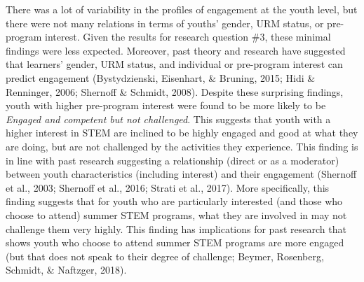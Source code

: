 \documentclass[]{book}
\theoremstyle{definition}
\theoremstyle{definition}
\theoremstyle{definition}
\theoremstyle{remark}
\begin{document}
There was a lot of variability in the profiles of engagement at the
youth level, but there were not many relations in terms of youths'
gender, URM status, or pre-program interest. Given the results for
research question \#3, these minimal findings were less expected.
Moreover, past theory and research have suggested that learners' gender,
URM status, and individual or pre-program interest can predict
engagement (Bystydzienski, Eisenhart, \& Bruning, 2015; Hidi \&
Renninger, 2006; Shernoff \& Schmidt, 2008). Despite these surprising
findings, youth with higher pre-program interest were found to be more
likely to be \emph{Engaged and competent but not challenged}. This
suggests that youth with a higher interest in STEM are inclined to be
highly engaged and good at what they are doing, but are not challenged
by the activities they experience. This finding is in line with past
research suggesting a relationship (direct or as a moderator) between
youth characteristics (including interest) and their engagement
(Shernoff et al., 2003; Shernoff et al., 2016; Strati et al., 2017).
More specifically, this finding suggests that for youth who are
particularly interested (and those who choose to attend) summer STEM
programs, what they are involved in may not challenge them very highly.
This finding has implications for past research that shows youth who
choose to attend summer STEM programs are more engaged (but that does
not speak to their degree of challenge; Beymer, Rosenberg, Schmidt, \&
Naftzger, 2018).
\end{document}
